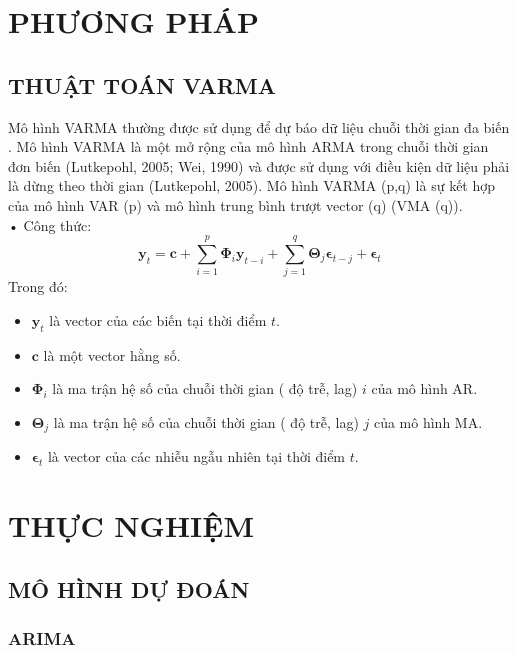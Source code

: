 \documentclass{article}
\begin{document}
\begin{multicols}{2}
\section{PHƯƠNG PHÁP}




\subsection{THUẬT TOÁN VARMA}
Mô hình VARMA thường được sử dụng để dự báo dữ liệu chuỗi thời gian đa biến . Mô hình VARMA là một mở rộng của mô hình ARMA trong chuỗi thời gian đơn biến (Lutkepohl, 2005; Wei, 1990) và được sử dụng với điều kiện dữ liệu phải là dừng theo thời gian (Lutkepohl, 2005). Mô hình VARMA (p,q) là sự kết hợp của mô hình VAR (p) và mô hình trung bình trượt vector (q) (VMA (q)).\\
 
    • Công thức:
    \begin{equation}
        \mathbf{y}_t = \mathbf{c} + \sum_{i=1}^{p} \mathbf{\Phi}_i \mathbf{y}_{t-i} + \sum_{j=1}^{q} \mathbf{\Theta}_j \boldsymbol{\epsilon}_{t-j} + \boldsymbol{\epsilon}_t
    \end{equation}  
Trong đó:  
    \begin{itemize}
      \item \( \mathbf{y}_t \) là vector của các biến tại thời điểm \( t \).
      \item \( \mathbf{c} \) là một vector hằng số.
      \item \( \mathbf{\Phi}_i \) là ma trận hệ số của chuỗi thời gian ( độ trễ, lag) \( i \) của mô hình AR.
      \item \( \mathbf{\Theta}_j \) là ma trận hệ số của chuỗi thời gian ( độ trễ, lag) \( j \) của mô hình MA.
      \item \( \boldsymbol{\epsilon}_t \) là vector của các nhiễu ngẫu nhiên tại thời điểm \( t \).
    \end{itemize} 

\section{THỰC NGHIỆM}

\subsection{MÔ HÌNH DỰ ĐOÁN }
\subsubsection{ARIMA}
  

\end{multicols}
\end{document}
